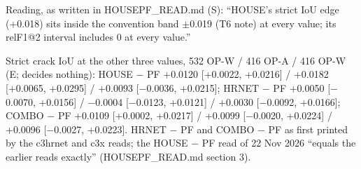 \begin{longtable}
{Reading, as written in HOUSEPF\_\allowbreak{}READ.md (S): ``HOUSE's strict IoU edge (+0.018) sits inside the convention band $\pm$0.019 (T6 note) at every value; its relF1@2 interval includes 0 at every value.''\par
Strict crack IoU at the other three values, 532 OP-W / 416 OP-A / 416 OP-W (E; decides nothing): HOUSE $-$ PF +0.0120 [+0.0022, +0.0216] / +0.0182 [+0.0065, +0.0295] / +0.0093 [$-$0.0036, +0.0215]; HRNET $-$ PF +0.0050 [$-$0.0070, +0.0156] / $-$0.0004 [$-$0.0123, +0.0121] / +0.0030 [$-$0.0092, +0.0166]; COMBO $-$ PF +0.0109 [+0.0002, +0.0217] / +0.0099 [$-$0.0020, +0.0224] / +0.0096 [$-$0.0027, +0.0223]. HRNET $-$ PF and COMBO $-$ PF as first printed by the c3hrnet and c3x reads; the HOUSE $-$ PF read of 22 Nov 2026 ``equals the earlier reads exactly'' (HOUSEPF\_\allowbreak{}READ.md section 3).\par
}\\
\end{longtable}
\endgroup

